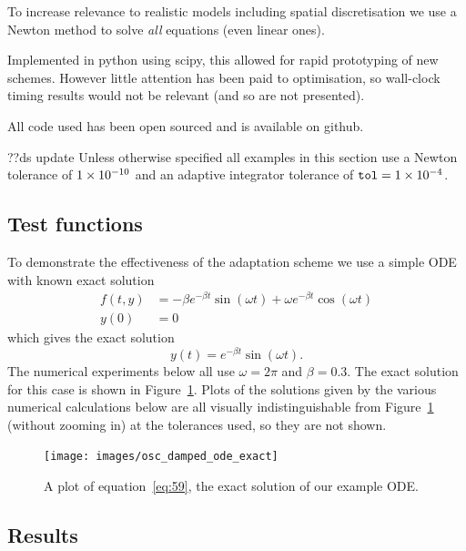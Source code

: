 To increase relevance to realistic models including spatial discretisation we use a Newton method to solve \emph{all} equations (even linear ones).

Implemented in python using scipy, this allowed for rapid prototyping of new schemes. However little attention has been paid to optimisation, so wall-clock timing results would not be relevant (and so are not presented).

All code used has been open sourced and is available on github.\cite{simple-ode-github}


??ds update
Unless otherwise specified all examples in this section use a Newton tolerance of $1\times 10^{-10}$ and an adaptive integrator tolerance of ${\textrm{\textup{\texttt{tol}}}} = 1\times 10^{-4}$.


\subsection{Test functions}

To demonstrate the effectiveness of the adaptation scheme we use a simple ODE with known exact solution
\begin{align}
  f(t,y) &= - \beta e^{-\beta t} \sin(\omega t) + \omega e^{-\beta t} \cos(\omega t) \\
  y(0) &= 0
\end{align}
which gives the exact solution
\begin{equation}
  \label{eq:59}
  y(t) = e^{-\beta t} \sin(\omega t).
\end{equation}
The numerical experiments below all use $\omega = 2 \pi$ and $\beta = 0.3$.
The exact solution for this case is shown in Figure~\ref{fig:mp-ode-exact}.
Plots of the solutions given by the various numerical calculations below are all visually indistinguishable from Figure~\ref{fig:mp-ode-exact} (without zooming in) at the tolerances used, so they are not shown.


\begin{figure}[ht!]
  \centering
  \texttt{[image: images/osc\_damped\_ode\_exact]}
  \caption{A plot of equation~\eqref{eq:59}, the exact solution of our example ODE.}
  \label{fig:mp-ode-exact}
\end{figure}

\subsection{Results}

